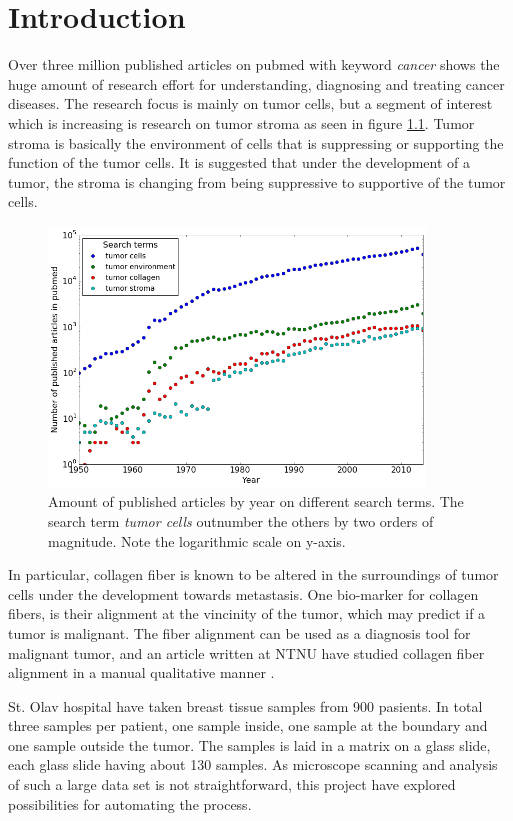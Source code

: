 \chapter{Introduction}

Over three million published articles on pubmed with keyword \textit{cancer} shows the huge amount of research effort for understanding, diagnosing and treating cancer diseases. The research focus is mainly on tumor cells, but a segment of interest which is increasing is research on tumor stroma as seen in figure \ref{fig:pubmed}. Tumor stroma is basically the environment of cells that is suppressing or supporting the function of the tumor cells. It is suggested that under the development of a tumor, the stroma is changing from being suppressive to supportive of the tumor cells.

\begin{figure}[h]
\centering
\includegraphics[width=10cm]{pubmed_tumor}
\caption{Amount of published articles by year on different search terms. The search term \textit{tumor cells} outnumber the others by two orders of magnitude. Note the logarithmic scale on y-axis.}
\label{fig:pubmed}
\end{figure}

In particular, collagen fiber is known to be altered in the surroundings of tumor cells under the development towards metastasis. One bio-marker for collagen fibers, is their alignment at the vincinity of the tumor, which may predict if a tumor is malignant. The fiber alignment can be used as a diagnosis tool for malignant tumor, and an article written at NTNU have studied collagen fiber alignment in a manual qualitative manner \cite{anna}.

St. Olav hospital have taken breast tissue samples from 900 pasients. In total three samples per patient, one sample inside, one sample at the boundary and one sample outside the tumor. The samples is laid in a matrix on a glass slide, each glass slide having about 130 samples. As microscope scanning and analysis of such a large data set is not straightforward, this project have explored possibilities for automating the process.


